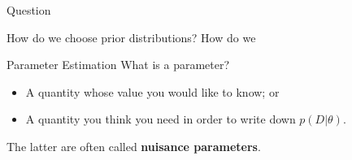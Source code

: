 \begin{frame}[t]{Question}

How do we choose prior distributions?
How do we 

\end{frame}



\begin{frame}[t]{Parameter Estimation}
What is a parameter?

\begin{itemize}
\item A quantity whose value you would like to know; or
\item A quantity you think you need in order to write down
$p(D | \theta)$.
\end{itemize}

The latter are often called {\bf nuisance parameters}.
\end{frame}




